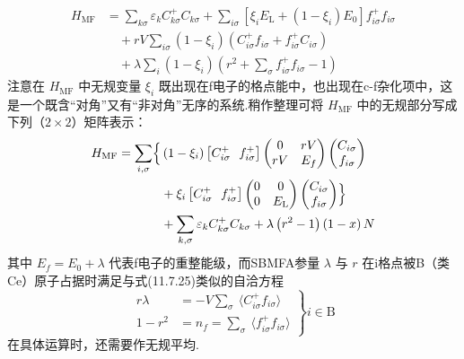 \begin{equation}
\begin{aligned}
  H_{\mathrm{MF}}&=\sum_{k\sigma}\varepsilon_{k}C_{k\sigma}^{+}C_{k\sigma}
  +\sum_{i\sigma}\left[\xi_{i}E_{\mathrm{L}}+\left(1-\xi_{i}\right)E_{0}\right]f_{i\sigma}^{+}f_{i\sigma}\\
  &\quad+rV\sum_{i\sigma}\left(1-\xi_{i}\right)
  \left(C_{i\sigma}^{+}f_{i\sigma}+f_{i\sigma}^{+}C_{i\sigma}\right)\\
  &\quad+\lambda\sum_{i}\left(1-\xi_{i}\right)
  \left(r^{2}+\sum_{\sigma}f_{i\sigma}^{+}f_{i\sigma}-1\right)
\end{aligned}
\end{equation}
注意在 $H_{\mathrm{MF}}$ 中无规变量 $\xi_{i}$ 既出现在f电子的格点能中，也出现在c-f杂化项中，这是一个既含“对角”又有“非对角”无序的系统.稍作整理可将 $H_{\mathrm{MF}}$ 中的无规部分写成下列（$2\times2$）矩阵表示：
\begin{equation}
\begin{aligned}
  H_{\mathrm{MF}}=\sum_{i,\sigma}\Bigl\{&\left(1-\xi_{i}\right)\left[C_{i\sigma}^{+}\ \ f_{i\sigma}^{+}\right]
  \begin{pmatrix}0 & rV\\ rV & E_{f}\end{pmatrix}
  \begin{pmatrix}C_{i\sigma}\\ f_{i\sigma}\end{pmatrix}\\
  &+\xi_{i}\left[C_{i\sigma}^{+}\ \ f_{i\sigma}^{+}\right]
  \begin{pmatrix}0 & 0\\ 0 & E_{\mathrm{L}}\end{pmatrix}
  \begin{pmatrix}C_{i\sigma}\\ f_{i\sigma}\end{pmatrix}\Bigr\}\\
  &+\sum_{k,\sigma}\varepsilon_{k}C_{k\sigma}^{+}C_{k\sigma}
  +\lambda\left(r^{2}-1\right)\left(1-x\right)N
\end{aligned}
\end{equation}
其中 $E_{f}=E_{0}+\lambda$ 代表f电子的重整能级，而SBMFA参量 $\lambda$ 与 $r$ 在i格点被B（类Ce）原子占据时满足与式(11.7.25)类似的自洽方程
\begin{equation}
  \left.
  \begin{aligned}
    r\lambda&=-V\sum_{\sigma}\ \langle C_{i\sigma}^{+}f_{i\sigma}\rangle\\
    1-r^{2}&=n_{f}=\sum_{\sigma}\ \langle f_{i\sigma}^{+}f_{i\sigma}\rangle
  \end{aligned}
  \right\}i\in\mathrm{B}
\end{equation}
在具体运算时，还需要作无规平均.

